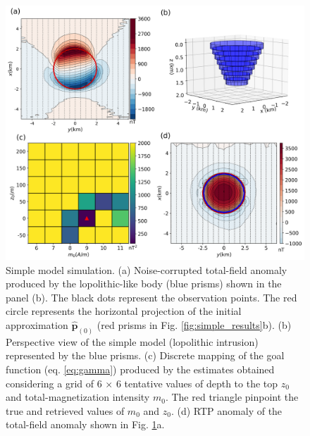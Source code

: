 \begin{figure}
    \centering
    \includegraphics[width=\linewidth]{figures/simple_model_data.png}
    \caption{Simple model simulation. (a) Noise-corrupted total-field anomaly produced by the lopolithic-like body (blue prisms) shown in the panel (b). The black dots represent the observation points. The red circle represents the horizontal projection 
    of the initial approximation $\hat{\mathbf{p}}_{(0)}$
    (red prisms in Fig. \ref{fig:simple_results}b).
    (b) Perspective view of the simple model (lopolithic intrusion) represented by the blue prisms. (c) Discrete mapping of the goal function (eq. \ref{eq:gamma}) produced by the estimates   	       obtained considering a grid of 6 $\times$ 6 tentative values of 
    depth to the top $z_0$ and total-magnetization intensity $m_0$. 
    The red triangle pinpoint the true and retrieved 	   
    values of $m_0$  and $z_0$. (d) RTP anomaly of the total-field anomaly shown in 
    Fig. \ref{fig:simple_model}a.
}
    \label{fig:simple_model}
\end{figure}


